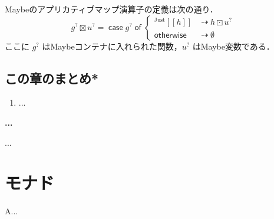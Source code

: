 \documentclass[a5paper,twoside,fleqn,draft]{jsbook}
\def\[{\left[\!\left[}
\def\]{\right]\!\right]}
\newenvironment{leader}{\begingroup\gt}{\endgroup}
\newenvironment{note}[1]{\begin{boxnote}\begin{center}\textbf{#1}\end{center}}{\end{boxnote}}
\newcommand{\mKeyword}[1]{\mathsf{#1}} %
\newcommand{\mIfKeyword}{\mKeyword{if}}
\newcommand{\mCaseKeyword}{\mKeyword{case}}
\newcommand{\mOfKeyword}{\mKeyword{of}}
\newcommand{\mOtherwiseKeyword}{\mKeyword{otherwise}}
\DeclareMathOperator{\mCaseKW}{\mCaseKeyword} %
\DeclareMathOperator{\mIf}{\mIfKeyword}
\DeclareMathOperator{\mOfKW}{\mOfKeyword} %
\DeclareMathOperator{\mOtherwise}{\mOtherwiseKeyword}
\newcommand{\mNothing}{\emptyset}
\DeclareMathOperator{\mAppMapMaybe}{\boxtimes}
\DeclareMathOperator{\mIfSo}{\dashrightarrow}
\DeclareMathOperator{\mLogicalAnd}{\wedge}
\DeclareMathOperator{\mMapMaybe}{\boxdot}
\newcommand{\mValueConstructor}[1]{\mathrm{#1}}
\newcommand{\mGenericValueAssemble}[2]{{}^\mValueConstructor{#1}\[#2\]}
\newcommand{\mJustWith}[1]{\mGenericValueAssemble{Just}{#1}}
\newcommand{\mMaybe}[1]{{#1}^?}
\newcommand{\mCaseOf}[1]{\mCaseKW#1\mOfKW}
\begin{document}
Maybeのアプリカティブマップ演算子の定義は次の通り．
\begin{equation}
\label{eq:maybe-applicative-map-by-maybe-map}
\mMaybe{g}\mAppMapMaybe\mMaybe{u}
=\mCaseOf{\mMaybe{g}}
\begin{cases}
\mJustWith{h}&\mIfSo h\mMapMaybe\mMaybe{u}\\
\mOtherwise&\mIfSo\mNothing
\end{cases}
\end{equation}
ここに $\mMaybe{g}$ はMaybeコンテナに入れられた関数，$\mMaybe{u}$ はMaybe変数である．

\section{この章のまとめ*}

\begin{enumerate}
\item ...
\end{enumerate}


\begin{note}{...}
...
%
\end{note}

\chapter{モナド}
\label{ch:monad}

\begin{leader}
A...
\end{leader}
\end{document}
